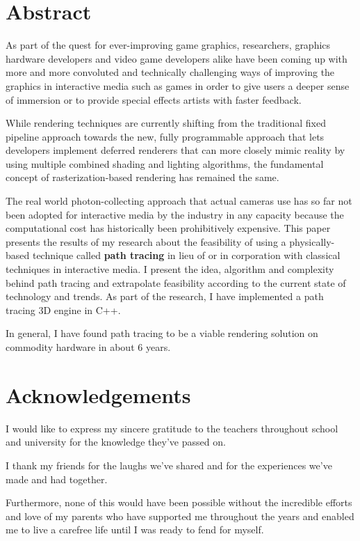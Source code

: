 \documentclass[
  twoside,
  11pt, a4paper,
  footinclude=true,
  headinclude=true,
  cleardoublepage=empty
]{scrreprt}
\begin{document}


\chapter*{Abstract}
\onehalfspace
As part of the quest for ever-improving game graphics, researchers, graphics hardware developers
and video game developers alike have been coming up with more and more convoluted and technically
challenging ways of improving the graphics in interactive media such as games in order to give
users a deeper sense of immersion or to provide special effects artists with faster feedback.

While rendering techniques are currently shifting from the traditional fixed pipeline approach
towards the new, fully programmable approach that lets developers implement deferred renderers that
can more closely mimic reality by using multiple combined shading and lighting algorithms, the
fundamental concept of rasterization-based rendering has remained the same.

The real world photon-collecting approach that actual cameras use has so far not been adopted for
interactive media by the industry in any capacity because the computational cost has historically
been prohibitively expensive.
This paper presents the results of my research about the feasibility of using a physically-based
technique called \textbf{path tracing} in lieu of or in corporation with classical techniques in interactive media. I
present the idea, algorithm and complexity behind path tracing and extrapolate feasibility
according to the current state of technology and trends. As part of the research, I have implemented a path tracing 3D engine in C++.

In general, I have found path tracing to be a viable rendering solution on commodity hardware in
about 6 years.
\singlespace

\chapter*{Acknowledgements}
\doublespacing
I would like to express my sincere gratitude to the teachers throughout school and university for
the knowledge they've passed on.

I thank my friends for the laughs we've shared and for the experiences we've made and had together.

Furthermore, none of this would have been possible without the incredible efforts and love of my
parents who have supported me throughout the years and enabled me to live a carefree life until I
was ready to fend for myself.
\end{document}
